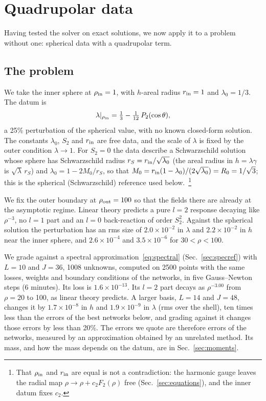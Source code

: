 \documentclass[aps,prd,twocolumn,superscriptaddress, nofootinbib,floatfix]{revtex4-2}
\begin{document}
\section{Quadrupolar data}\label{sec:quadrupole}
Having tested the solver on exact solutions, we now apply it to a problem without one: spherical data with a quadrupolar term.
\subsection{The problem}

We take the inner sphere at $\rho_{\rm in}=1$, with $h$-areal radius $r_{\rm in}=1$ and $\lambda_0=1/3$.
The datum is
\begin{equation}
  \lambda|_{\rho_{\rm in}} = \tfrac13 - \tfrac1{12}\,P_2(\cos\theta) ,
\end{equation}
a 25\% perturbation of the spherical value, with no known closed-form solution.
The constants $\lambda_0$, $S_2$ and $r_{\rm in}$ are free data, and the scale of $\lambda$ is fixed by the outer condition $\lambda\to1$.
For $S_2=0$ the data describe a Schwarzschild solution whose sphere has Schwarzschild radius $r_S=r_{\rm in}/\sqrt{\lambda_0}$ (the areal radius in $h=\lambda\gamma$ is $\sqrt\lambda\,r_S$) and $\lambda_0=1-2M_0/r_S$, so that $M_0=r_{\rm in}(1-\lambda_0)/(2\sqrt{\lambda_0})=R_0=1/\sqrt3$; this is the spherical (Schwarzschild) reference used below.~\footnote{That $\rho_{\rm in}$ and $r_{\rm in}$ are equal is not a contradiction: the harmonic gauge leaves the radial map $\rho\to\rho+c_2F_2(\rho)$ free (Sec.~\ref{sec:equations}), and the inner datum fixes $c_2$.}

We fix the outer boundary at $\rho_{\rm out}=100$ so that the fields there are already at the asymptotic regime. 
Linear theory predicts a pure $l=2$ response decaying like $\rho^{-3}$, no $l=1$ part and an $l=0$ back-reaction of order $S_2^2$.
Against the spherical solution the perturbation has an rms size of $2.0\times10^{-2}$ in $\lambda$ and $2.2\times10^{-2}$ in $h$ near the inner sphere, and $2.6\times10^{-4}$ and $3.5\times10^{-6}$ for $30<\rho<100$.

We grade against a spectral approximation~\eqref{eq:spectral} (Sec.~\ref{sec:specref}) with $L = 10$ and $J = 36$, 1008 unknowns, computed on 2500 points with the same losses, weights and boundary conditions of the networks, in five Gauss--Newton steps (6 minutes).
Its loss is $1.6\times10^{-13}$.
Its $l=2$ part decays as $\rho^{-3.00}$ from $\rho=20$ to 100, as linear theory predicts.
A larger basis, $L=14$ and $J=48$, changes it by $1.7\times10^{-8}$ in $h$ and $1.9\times10^{-9}$ in $\lambda$ (rms over the shell), ten times less than the errors of the best networks below, and grading against it changes those errors by less than 20\%.
The errors we quote are therefore errors of the networks, measured by an approximation obtained by an unrelated method.
Its mass, and how the mass depends on the datum, are in Sec.~\ref{sec:moments}.
\end{document}
